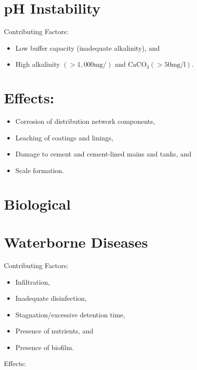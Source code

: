 \documentclass[10pt]{article}
\begin{document}
\section{pH Instability}
Contributing Factors:

\begin{itemize}
  \item Low buffer capacity (inadequate alkalinity), and

  \item High alkalinity $(>1,000 \mathrm{mg} /)$ and $\mathrm{CaCO}_{3}(>50 \mathrm{mg} / \mathrm{l})$.

\end{itemize}
\section{Effects:}
\begin{itemize}
  \item Corrosion of distribution network components,

  \item Leaching of coatings and linings,

  \item Damage to cement and cement-lined mains and tanks, and

  \item Scale formation.

\end{itemize}
\section{Biological}
\section{Waterborne Diseases}
Contributing Factors:

\begin{itemize}
  \item Infiltration,

  \item Inadequate disinfection,

  \item Stagnation/excessive detention time,

  \item Presence of nutrients, and

  \item Presence of biofilm.

\end{itemize}
Effects:
\end{document}
